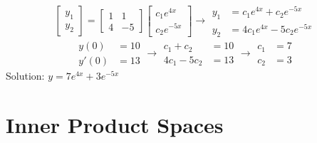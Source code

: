 \documentclass[12pt]{article}
\begin{document}
\begin{example}
$$\begin{bmatrix} y_1 \\ y_2 \end{bmatrix} = \begin{bmatrix} 1 & 1 \\ 4 & -5 \end{bmatrix}\begin{bmatrix} c_1e^{4x} \\ c_2e^{-5x} \end{bmatrix} \rightarrow \begin{aligned} y_1 &= c_1e^{4x} + c_2e^{-5x} \\ y_2 &= 4c_1e^{4x} - 5c_2e^{-5x} \end{aligned} $$ 
$$\begin{aligned} y(0) &= 10 \\ y'(0) &= 13 \end{aligned} \rightarrow \begin{aligned} c_1 + c_2 &= 10 \\ 4c_1 - 5c_2 &= 13 \end{aligned} \rightarrow \begin{aligned} c_1 &= 7 \\ c_2 &= 3 \end{aligned} $$ Solution: $y = 7e^{4x} + 3e^{-5x}$\end{example} 

\section{Inner Product Spaces} 
\end{document}
